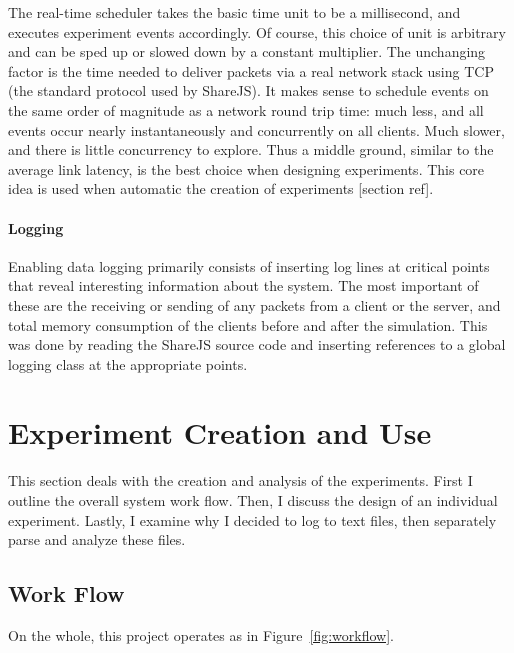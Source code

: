 \documentclass[12pt,a4paper,twoside,openright]{report}
\begin{document}
	The real-time scheduler takes the basic time unit to be a millisecond, and executes experiment events accordingly. Of course, this choice of unit is arbitrary and can be sped up or slowed down by a constant multiplier. The unchanging factor is the time needed to deliver packets via a real network stack using TCP (the standard protocol used by ShareJS). It makes sense to schedule events on the same order of magnitude as a network round trip time: much less, and all events occur nearly instantaneously and concurrently on all clients. Much slower, and there is little concurrency to explore. Thus a middle ground, similar to the average link latency, is the best choice when designing experiments. This core idea is used when automatic the creation of experiments [section ref].
	
	\paragraph{Logging}
	Enabling data logging primarily consists of inserting log lines at critical points that reveal interesting information about the system. The most important of these are the receiving or sending of any packets from a client or the server, and total memory consumption of the clients before and after the simulation. This was done by reading the ShareJS source code and inserting references to a global logging class at the appropriate points.
	
\section{Experiment Creation and Use}

	This section deals with the creation and analysis of the experiments. First I outline the overall system work flow. Then, I discuss the design of an individual experiment. Lastly, I examine why I decided to log to text files, then separately parse and analyze these files.

	\subsection{Work Flow}
	On the whole, this project operates as in Figure~\ref{fig:workflow}. 
	
\end{document}
